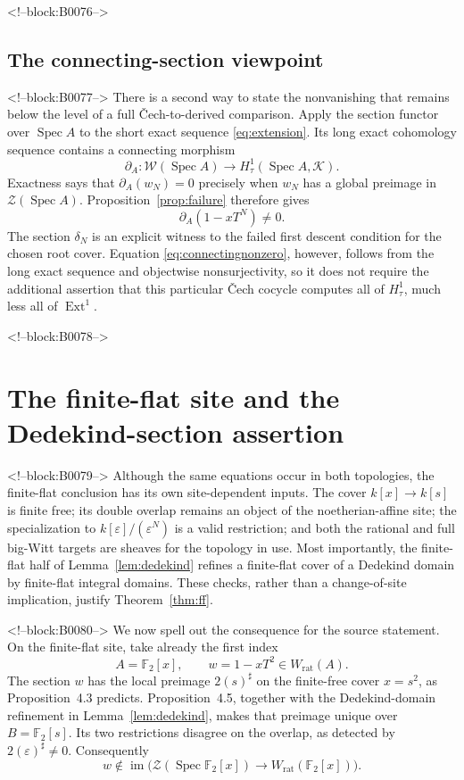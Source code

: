 \documentclass[11pt]{article}
\theoremstyle{definition}
\newcommand{\Spec}{\operatorname{Spec}}
\newcommand{\Ext}{\operatorname{Ext}}
\newcommand{\Wrat}{W_{\mathrm{rat}}}
\newcommand{\Zsh}{\mathcal Z}
\newcommand{\Wsh}{\mathcal W}
\newcommand{\Ksh}{\mathcal K}
\newcommand{\sh}{\sharp}
\begin{document}
<!--block:B0076-->
\subsection{The connecting-section viewpoint}

<!--block:B0077-->
There is a second way to state the nonvanishing that remains below the
level of a full \v Cech-to-derived comparison.  Apply the section functor
over \(\Spec A\) to the short exact sequence
\eqref{eq:extension}.  Its long exact cohomology sequence contains a
connecting morphism
\[
 \partial_A\colon
 \Wsh(\Spec A)\longrightarrow
 H^1_\tau(\Spec A,\Ksh).
 \tag{5.2}\label{eq:connecting}
\]
Exactness says that \(\partial_A(w_N)=0\) precisely when \(w_N\) has a
global preimage in \(\Zsh(\Spec A)\).  Proposition~\ref{prop:failure}
therefore gives
\[
 \partial_A(1-xT^N)\ne0.
 \tag{5.3}\label{eq:connectingnonzero}
\]
The section \(\delta_N\) is an explicit witness to the failed first
descent condition for the chosen root cover.  Equation
\eqref{eq:connectingnonzero}, however, follows from the long exact
sequence and objectwise nonsurjectivity, so it does not require the
additional assertion that this particular \v Cech cocycle computes all of
\(H^1_\tau\), much less all of \(\Ext^1\).

<!--block:B0078-->
\section{The finite-flat site and the Dedekind-section assertion}
\label{sec:finiteflat}

<!--block:B0079-->
Although the same equations occur in both topologies, the finite-flat
conclusion has its own site-dependent inputs.  The cover
\(k[x]\to k[s]\) is finite free; its double overlap remains an object of
the noetherian-affine site; the specialization to
\(k[\varepsilon]/(\varepsilon^N)\) is a valid restriction; and both the
rational and full big-Witt targets are sheaves for the topology in use.
Most importantly, the finite-flat half of
Lemma~\ref{lem:dedekind} refines a finite-flat cover of a Dedekind domain
by finite-flat integral domains.  These checks, rather than a change-of-site
implication, justify Theorem~\ref{thm:ff}.

<!--block:B0080-->
We now spell out the consequence for the source statement.  On the
finite-flat site, take already the first index
\[
 A=\mathbb F_2[x],\qquad w=1-xT^2\in\Wrat(A).
 \tag{6.1}\label{eq:cor46example}
\]
The section \(w\) has the local preimage \(2(s)^\sh\) on the finite-free
cover \(x=s^2\), as Proposition~4.3 predicts.  Proposition~4.5, together
with the Dedekind-domain refinement in Lemma~\ref{lem:dedekind}, makes that
preimage unique over \(B=\mathbb F_2[s]\).  Its two restrictions disagree
on the overlap, as detected by \(2(\varepsilon)^\sh\ne0\).  Consequently
\[
 w\notin
 \operatorname{im}\bigl(
 \Zsh(\Spec\mathbb F_2[x])\longrightarrow
 \Wrat(\mathbb F_2[x])\bigr).
 \tag{6.2}\label{eq:notimage}
\]
\end{document}
